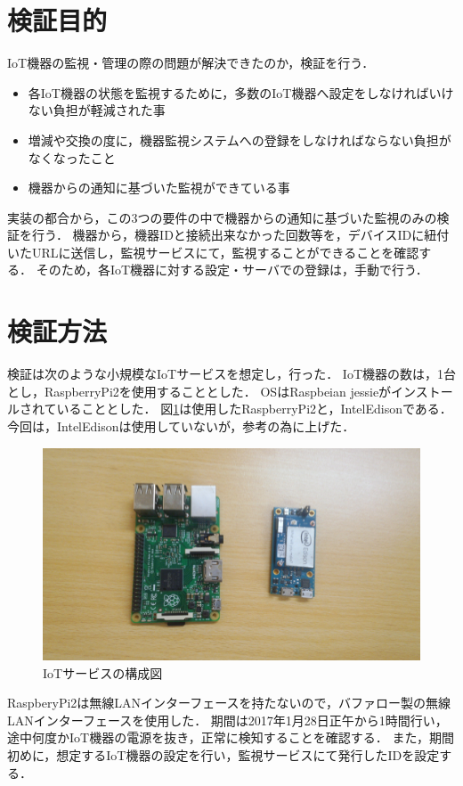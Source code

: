 \section{検証目的}
IoT機器の監視・管理の際の問題が解決できたのか，検証を行う．
\begin{itemize}
\item 各IoT機器の状態を監視するために，多数のIoT機器へ設定をしなければいけない負担が軽減された事
\item 増減や交換の度に，機器監視システムへの登録をしなければならない負担がなくなったこと
\item 機器からの通知に基づいた監視ができている事
\end{itemize}

実装の都合から，この3つの要件の中で機器からの通知に基づいた監視のみの検証を行う．
機器から，機器IDと接続出来なかった回数等を，デバイスIDに紐付いたURLに送信し，監視サービスにて，監視することができることを確認する．
そのため，各IoT機器に対する設定・サーバでの登録は，手動で行う．

\section{検証方法}
検証は次のような小規模なIoTサービスを想定し，行った．
IoT機器の数は，1台とし，RaspberryPi2を使用することとした．
OSはRaspbeian jessieがインストールされていることとした．
図\ref{fig:device}は使用したRaspberryPi2と，IntelEdisonである．
今回は，IntelEdisonは使用していないが，参考の為に上げた．
\begin{figure}[htbp]
\includegraphics[width=14cm]{images/device.png}
\caption{IoTサービスの構成図}
\label{fig:device}
\end{figure}

RaspberyPi2は無線LANインターフェースを持たないので，バファロー製の無線LANインターフェースを使用した．
期間は2017年1月28日正午から1時間行い，途中何度かIoT機器の電源を抜き，正常に検知することを確認する．
また，期間初めに，想定するIoT機器の設定を行い，監視サービスにて発行したIDを設定する．

